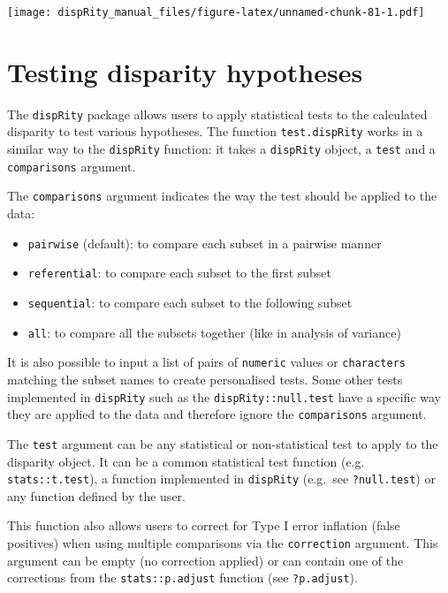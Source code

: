 \documentclass[]{book}
\providecommand{\tightlist}{%
  \setlength{\itemsep}{0pt}\setlength{\parskip}{0pt}}
\begin{document}
\texttt{[image: dispRity\_manual\_files/figure-latex/unnamed-chunk-81-1.pdf]}

\hypertarget{testing-disparity-hypotheses}{%
\section{Testing disparity hypotheses}\label{testing-disparity-hypotheses}}

The \texttt{dispRity} package allows users to apply statistical tests to the calculated disparity to test various hypotheses.
The function \texttt{test.dispRity} works in a similar way to the \texttt{dispRity} function: it takes a \texttt{dispRity} object, a \texttt{test} and a \texttt{comparisons} argument.

The \texttt{comparisons} argument indicates the way the test should be applied to the data:

\begin{itemize}
\tightlist
\item
  \texttt{pairwise} (default): to compare each subset in a pairwise manner
\item
  \texttt{referential}: to compare each subset to the first subset
\item
  \texttt{sequential}: to compare each subset to the following subset
\item
  \texttt{all}: to compare all the subsets together (like in analysis of variance)
\end{itemize}

It is also possible to input a list of pairs of \texttt{numeric} values or \texttt{characters} matching the subset names to create personalised tests.
Some other tests implemented in \texttt{dispRity} such as the \texttt{dispRity::null.test} have a specific way they are applied to the data and therefore ignore the \texttt{comparisons} argument.

The \texttt{test} argument can be any statistical or non-statistical test to apply to the disparity object.
It can be a common statistical test function (e.g. \texttt{stats::t.test}), a function implemented in \texttt{dispRity} (e.g.~see \texttt{?null.test}) or any function defined by the user.

This function also allows users to correct for Type I error inflation (false positives) when using multiple comparisons via the \texttt{correction} argument.
This argument can be empty (no correction applied) or can contain one of the corrections from the \texttt{stats::p.adjust} function (see \texttt{?p.adjust}).
\end{document}
